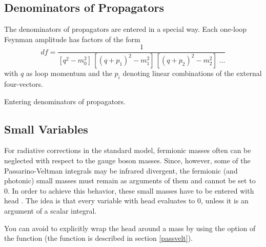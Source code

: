 \subsection{Denominators of Propagators}
The denominators of propagators are entered in a special way.
Each one-loop Feynman amplitude has factors of the form
$$
df = \frac {1}{[q^{2}-m_{0}^{2}]\, [(q+p_{1})^{2}-m_{1}^{2}] \,
             [(q+p_{2})^{2}-m_{2}^{2}] \; \ldots
                     }
$$
with $q$ as loop momentum and the $p_{i}$ denoting linear combinations of the
external four-vectors.

 {Entering denominators of propagators.}

\beom
{}
\enom

\subsection{Small Variables}

For radiative corrections in the standard model, fermionic masses
often can be neglected with respect to the gauge boson masses.
Since, however, some of the Passarino-Veltman integrals may be infrared divergent,
the fermionic (and photonic) small masses must remain as
arguments of them and cannot be set to 0.
In order to achieve this behavior, these small masses have to be
entered with  head .
The idea is that every variable with head  evaluates
to $0$, unless it is an argument of a scalar integral.

You can avoid to explicitly wrap the head  around a mass by
using the option  of the function 
(the function  is described in section \ref{passvelt}).



